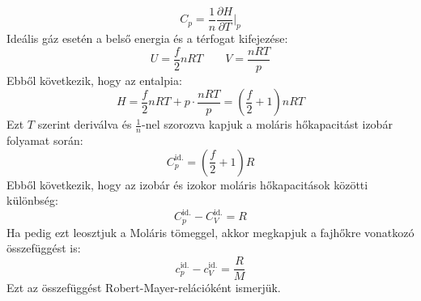 \documentclass[../main.tex]{subfiles}
\begin{document}
\begin{equation}
    C_p = \frac{1}{n} \frac{\partial H}{\partial T}\bigg|_{p}
\end{equation}
Ideális gáz esetén a belső energia és a térfogat kifejezése:
\begin{equation}
    U = \frac{f}{2} n R T \qquad V = \frac{n R T}{p}
\end{equation}
Ebből következik, hogy az entalpia:
\begin{equation}
    H = \frac{f}{2} n R T + p \cdot \frac{n R T}{p} = \left(\frac{f}{2} + 1\right) n R T
\end{equation}
Ezt $T$ szerint deriválva és $\frac{1}{n}$-nel szorozva kapjuk a moláris hőkapacitást izobár folyamat során:
\begin{equation}
    C^{\text{id.}}_p = \left(\frac{f}{2} + 1\right) R
\end{equation}
Ebből következik, hogy az izobár és izokor moláris hőkapacitások közötti különbség:
\begin{equation}
    C^{\text{id.}}_p - C^{\text{id.}}_V = R
\end{equation}
Ha pedig ezt leosztjuk a Moláris tömeggel, akkor megkapjuk a fajhőkre vonatkozó összefüggést is:
\begin{equation}
    c^{\text{id.}}_p - c^{\text{id.}}_V = \frac{R}{M}
\end{equation}
Ezt az összefüggést Robert-Mayer-relációként ismerjük.
\end{document}
